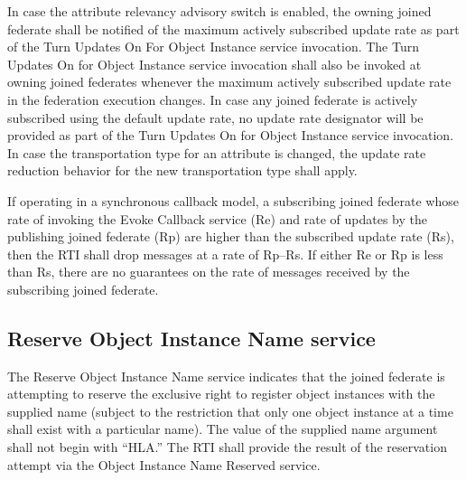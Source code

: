 \begin{compactstdpage}



    In case the attribute relevancy advisory switch is enabled, the owning joined federate shall be notified of the maximum actively subscribed update rate as part of the Turn Updates On For Object Instance \rtiinitiated{} service invocation. The Turn Updates On for Object Instance \rtiinitiated{} service invocation shall also be invoked at owning joined federates whenever the maximum actively subscribed update rate in the federation execution changes. In case any joined federate is actively subscribed using the default update rate, no update rate designator will be provided as part of the Turn Updates On for Object Instance \rtiinitiated{} service invocation. In case the transportation type for an attribute is changed, the update rate reduction behavior for the new transportation type shall apply.


    If operating in a synchronous callback model, a subscribing joined federate whose rate of invoking the Evoke Callback service (Re) and rate of updates by the publishing joined federate (Rp) are higher than the subscribed update rate (Rs), then the RTI shall drop messages at a rate of Rp--Rs. If either Re or Rp is less than Rs, there are no guarantees on the rate of messages received by the subscribing joined federate.

    \subsection{Reserve Object Instance Name service}


    The Reserve Object Instance Name service indicates that the joined federate is attempting to reserve the exclusive right to register object instances with the supplied name (subject to the restriction that only one object instance at a time shall exist with a particular name). The value of the supplied name argument shall not begin with ``HLA.'' The RTI shall provide the result of the reservation attempt via the Object Instance Name Reserved \rtiinitiated{} service.


\end{compactstdpage}
